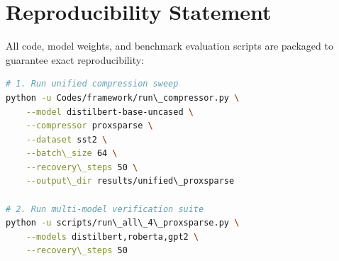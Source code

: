 \section{Reproducibility Statement}
All code, model weights, and benchmark evaluation scripts are packaged to guarantee exact reproducibility:
\begin{lstlisting}[language=bash]
# 1. Run unified compression sweep
python -u Codes/framework/run\_compressor.py \
    --model distilbert-base-uncased \
    --compressor proxsparse \
    --dataset sst2 \
    --batch\_size 64 \
    --recovery\_steps 50 \
    --output\_dir results/unified\_proxsparse

# 2. Run multi-model verification suite
python -u scripts/run\_all\_4\_proxsparse.py \
    --models distilbert,roberta,gpt2 \
    --recovery\_steps 50
\end{lstlisting}
